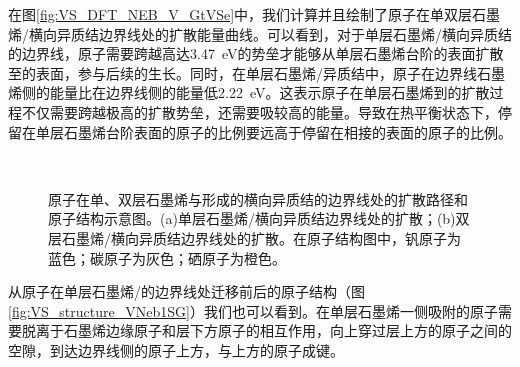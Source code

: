     在图\ref{fig:VS_DFT_NEB_V_GtVSe}中，我们计算并且绘制了原子在单双层石墨烯/横向异质结边界线处的扩散能量曲线。可以看到，对于单层石墨烯/横向异质结的边界线，原子需要跨越高达\SI{3.47}{\electronvolt}的势垒才能够从单层石墨烯台阶的表面扩散至的表面，参与后续的生长。同时，在单层石墨烯/异质结中，原子在边界线石墨烯侧的能量比在边界线侧的能量低\SI{2.22}{\electronvolt}。这表示原子在单层石墨烯到的扩散过程不仅需要跨越极高的扩散势垒，还需要吸较高的能量。导致在热平衡状态下，停留在单层石墨烯台阶表面的原子的比例要远高于停留在相接的表面的原子的比例。
    
    \begin{figure}[htb]
        \\[-0.5ex]
        \caption{原子在单、双层石墨烯与形成的横向异质结的边界线处的扩散路径和原子结构示意图。(a)单层石墨烯/横向异质结边界线处的扩散；(b)双层石墨烯/横向异质结边界线处的扩散。在原子结构图中，钒原子为蓝色；碳原子为灰色；硒原子为橙色。}
        \label{fig:VS_structure_VNeb}
    \end{figure}

    从原子在单层石墨烯/的边界线处迁移前后的原子结构（图\ref{fig:VS_structure_VNeb1SG}）我们也可以看到。在单层石墨烯一侧吸附的原子需要脱离于石墨烯边缘原子和层下方原子的相互作用，向上穿过层上方的原子之间的空隙，到达边界线侧的原子上方，与上方的原子成键。

